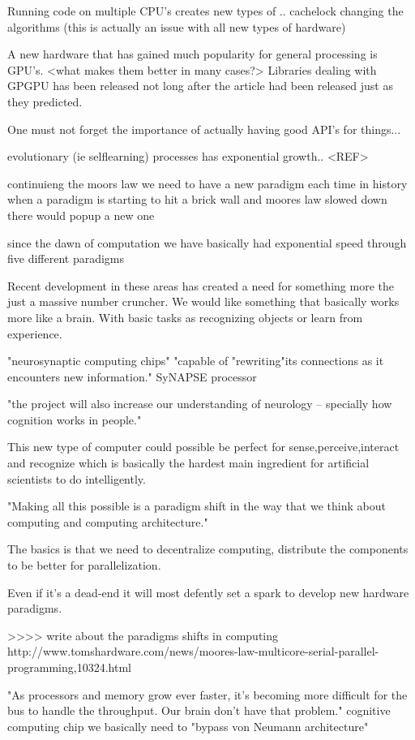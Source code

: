 \documentclass{article}
\begin{document}
    Running code on multiple CPU's creates new types of .. 
    cachelock
    changing the algorithms (this is actually an issue with all new types of
    hardware)

    A new hardware that has gained much popularity for general processing is
    GPU's. <what makes them better in many cases?> 
    Libraries dealing with GPGPU has been released not long after the
    article\cite{ms2020} had been released just as they predicted.

    One must not forget the importance of actually having good API's for
    things...

evolutionary (ie selflearning) processes has exponential growth.. <REF>

continuieng the moors law we need to have a new paradigm
each time in history when a paradigm is starting to hit a brick wall and
moores law slowed down there would popup a new one

since the dawn of computation we have basically had exponential speed through
five different paradigms


Recent development in these areas has created a need for something more the
just a massive number cruncher. We would like something that basically works
more like a brain. With basic tasks as recognizing objects or learn from
experience.
\cite{synapse}

"neurosynaptic computing chips" 
"capable of "rewriting"its connections as it
encounters new information."
SyNAPSE processor

"the project will also increase our understanding of neurology -- specially how
cognition works in people."

This new type of computer could possible be perfect for sense,perceive,interact
and recognize which is basically the hardest main ingredient for artificial
scientists to do intelligently.

"Making all this possible is a paradigm shift in the way that we think about
computing and computing architecture."

The basics is that we need to decentralize computing, distribute the components
to be better for parallelization.

Even if it's a dead-end it will most defently set a spark to develop new
hardware paradigms.

>>>> write about the paradigms shifts in computing
http://www.tomshardware.com/news/moores-law-multicore-serial-parallel-programming,10324.html

"As processors and memory grow ever faster, it's becoming more difficult for
the bus to handle the throughput. Our brain don't have that problem."
cognitive computing chip
we basically need to "bypass von Neumann architecture"
\end{document}

